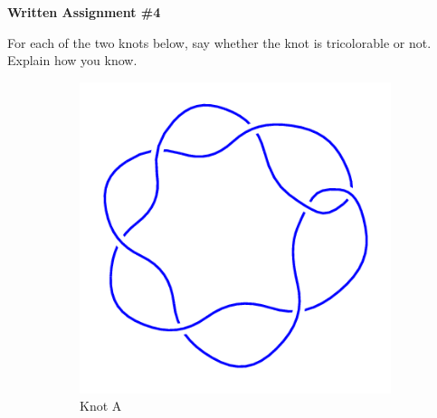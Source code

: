 \documentclass[12pt,letterpaper]{article}
\begin{document}
\setlength{\parskip}{1ex plus 0.5ex minus 0.2ex}
\setlength{\parindent}{0pt}

\pagestyle{fancy}
\lfoot{}
\rfoot{}

\begin{center}
{
\Large
\textbf{Written Assignment \#4}
}
\end{center}

For each of the two knots below, say whether the knot is tricolorable or not. Explain how you know.

\begin{figure}[h]
    \centering
    \begin{subfigure}{.45\textwidth}
        \centering
        \includegraphics[width=\textwidth]{homework04pics/7_2.png}
        \caption{Knot A}
    \end{subfigure}
    \qquad
    \begin{subfigure}{.45\textwidth}
        \centering

\end{subfigure}
\end{figure}
\end{document}
